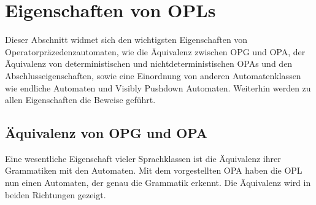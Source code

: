 \section{Eigenschaften von OPLs}
Dieser Abschnitt widmet sich den wichtigsten Eigenschaften von Operatorpräzedenzautomaten, wie die Äquivalenz zwischen OPG und OPA, der Äquivalenz von deterministischen und nichtdeterministischen OPAs und den Abschlusseigenschaften, sowie eine Einordnung von anderen Automatenklassen wie endliche Automaten und Visibly Pushdown Automaten. Weiterhin werden zu allen Eigenschaften die Beweise geführt.
\subsection{Äquivalenz von OPG und OPA}
Eine wesentliche Eigenschaft vieler Sprachklassen ist die Äquivalenz ihrer Grammatiken mit den Automaten. Mit dem vorgestellten OPA haben die OPL nun einen Automaten, der genau die Grammatik erkennt. Die Äquivalenz wird in beiden Richtungen gezeigt. \cite{precedence_automata, mso}

